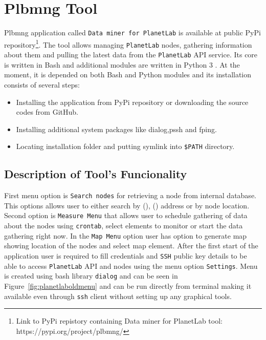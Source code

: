 \chapter{Plbmng Tool}
\label{chapter:plbmng}
Plbmng application called \texttt{Data miner for PlanetLab} is available at public PyPi repository\footnote{Link to PyPi repistory containing Data miner for PlanetLab tool: https://pypi.org/project/plbmng/}. The tool allows managing \texttt{PlanetLab} nodes, gathering information about them and pulling the latest data from the \texttt{PlanetLab} API service. Its core is written in Bash and additional modules are written in Python 3 \cite{suba1}. At the moment, it is depended on both Bash and Python modules and its installation consists of several steps:
\begin{itemize}
	\item Installing the application from PyPi repository or downloading the source codes from GitHub.
	\item Installing additional system packages like dialog,pssh and fping.
	\item Locating installation folder and putting symlink into \texttt{\$PATH} directory.
\end{itemize}
\section{Description of Tool's Funcionality}
First menu option is \texttt{Search nodes} for retrieving a node from internal database. This options allows user to either search by  (),  () address or by node location. Second option is \texttt{Measure Menu} that allows user to schedule gathering of data about the nodes using \texttt{crontab}, select elements to monitor or start the data gathering right now. In the \texttt{Map Menu} option user has option to generate map showing location of the nodes and select map element. After the first start of the application user is required to fill credentials and \texttt{SSH} public key details to be able to access \texttt{PlanetLab} API and nodes using the menu option \texttt{Settings}. Menu is created using bash library \texttt{dialog} and can be seen in Figure~\ref{fig:planetlaboldmenu} and can be run directly from terminal making it available even through \texttt{ssh} client without setting up any graphical tools.


